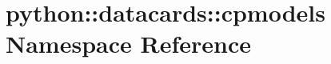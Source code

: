 \hypertarget{namespacepython_1_1datacards_1_1cpmodels}{
\section{python::datacards::cpmodels Namespace Reference}
\label{namespacepython_1_1datacards_1_1cpmodels}
}
